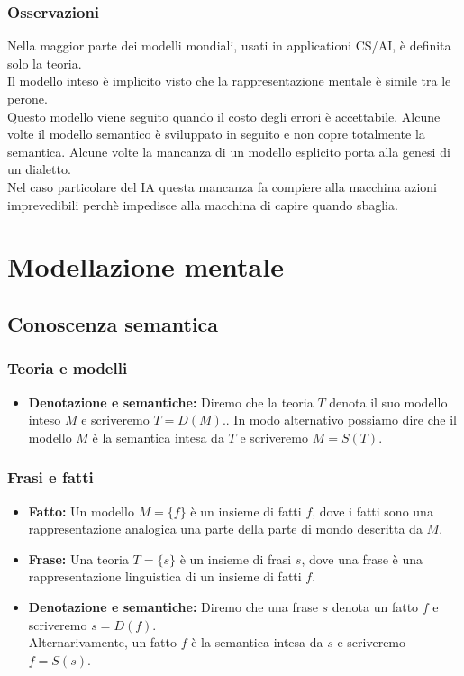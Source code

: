 \documentclass{book}
\newcommand{\spazio}{\vspace{1em} \newline}
\begin{document}
        \subsection{Osservazioni}
        Nella maggior parte dei modelli mondiali, usati in applicationi CS/AI, è definita solo la teoria.\\
        Il modello inteso è implicito visto che la rappresentazione mentale è simile tra le perone.\\
        Questo modello viene seguito quando il costo degli errori è accettabile.
        \spazio
        Alcune volte il modello semantico è sviluppato in seguito e non copre totalmente la semantica.
        \spazio
        Alcune volte la mancanza di un modello esplicito porta alla genesi di un dialetto.\\
        Nel caso particolare del IA questa mancanza fa compiere alla macchina azioni imprevedibili perchè impedisce alla macchina di capire quando sbaglia.

    \chapter{Modellazione mentale}
    \section{Conoscenza semantica}
    \subsection{Teoria e modelli}
    \begin{itemize}
        \item \textbf{Denotazione e semantiche:} Diremo che la teoria $T$ denota il suo modello inteso $M$ e scriveremo $T=D(M)$..
            In modo alternativo possiamo dire che il modello $M$ è la semantica intesa da $T$ e scriveremo $M=S(T)$.
    \end{itemize}

    \subsection{Frasi e fatti}
    \begin{itemize}
        \item \textbf{Fatto:} Un modello $M=\{f\}$ è un insieme di fatti $f$, dove i fatti sono una rappresentazione analogica una parte della parte di mondo descritta da $M$.
        \item \textbf{Frase:} Una teoria $T=\{s\}$ è un insieme di frasi $s$, dove una frase è una rappresentazione linguistica di un insieme di fatti $f$.
        \item \textbf{Denotazione e semantiche:} Diremo che una frase $s$ denota un fatto $f$ e scriveremo $s=D(f)$.\\
            Alternarivamente, un fatto $f$ è la semantica intesa da $s$ e scriveremo $f=S(s)$.
    \end{itemize}
\end{document}

